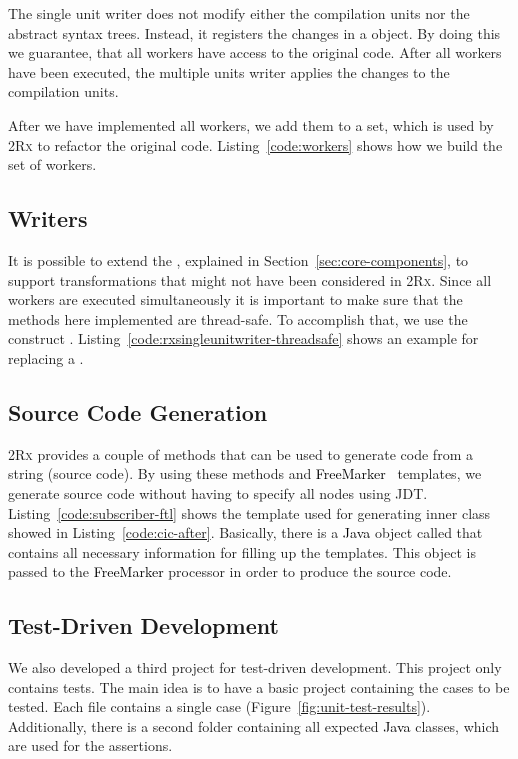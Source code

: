 \documentclass[type=bsc,accentcolor=tud9c]{tudthesis}
\newcommand{\framework}[1]{\textcolor{black}{#1}}
\newcommand{\toolcore}{\textsc{2Rx}}
\begin{document}
The single unit writer does not modify either the compilation units nor the abstract syntax trees. Instead, it registers the changes in a  object. By doing this we guarantee, that all workers have access to the original code. After all workers have been executed, the multiple units writer applies the changes to the compilation units.



After we have implemented all workers, we add them to a set, which is used by \toolcore{} to refactor the original code. Listing~\ref{code:workers} shows how we build the set of workers.



\subsection{Writers}
It is possible to extend the , explained in Section~\ref{sec:core-components}, to support transformations that might not have been considered in \toolcore{}. Since all workers are executed simultaneously it is important to make sure that the methods here implemented are thread-safe. To accomplish that, we use the construct . Listing~\ref{code:rxsingleunitwriter-threadsafe} shows an example for replacing a .



\subsection{Source Code Generation}
\toolcore{} provides a couple of methods that can be used to generate code from a string (source code). By using these methods and \framework{FreeMarker}~\cite{freeMarker} templates, we generate source code without having to specify all nodes using JDT. Listing~\ref{code:subscriber-ftl} shows the template used for generating inner class  showed in Listing~\ref{code:cic-after}. Basically, there is a \framework{Java} object called  that contains all necessary information for filling up the templates. This object is passed to the \framework{FreeMarker} processor in order to produce the source code.



\subsection{Test-Driven Development}
\label{sec:test-driven-dev}
We also developed a third project for test-driven development. This project only contains tests. The main idea is to have a basic project containing the cases to be tested. Each file contains a single case (Figure~\ref{fig:unit-test-results}). Additionally, there is a second folder containing all expected \framework{Java} classes, which are used for the assertions.
\end{document}
